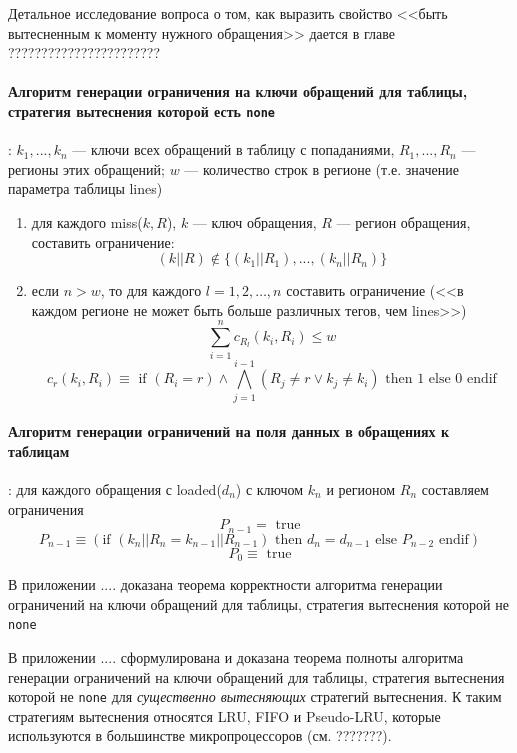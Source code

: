 \documentclass[14pt]{extreport}
\newcommand{\LRU}{\textsf{LRU}\xspace}
\newcommand{\FIFO}{\textsf{FIFO}\xspace}
\newcommand{\PseudoLRU}{\textsf{Pseudo-LRU}\xspace}
\begin{document}
Детальное исследование вопроса о том, как выразить свойство <<быть вытесненным к моменту нужного обращения>> дается в главе ???????????????????????

\paragraph{Алгоритм генерации ограничения на ключи обращений для таблицы, стратегия вытеснения которой есть \texttt{none}}: $k_1, ..., k_n$ --- ключи всех обращений в таблицу с попаданиями, $R_1, ..., R_n$ --- регионы этих обращений; $w$ --- количество строк в регионе (т.е. значение параметра таблицы lines)

\begin{enumerate}
    \item для каждого miss($k, R$), $k$ --- ключ обращения, $R$ --- регион обращения, составить ограничение: $$(k||R) \notin \{(k_1||R_1), ..., (k_n||R_n) \}$$

    \item если $n > w$, то для каждого $l = 1, 2, \dots, n$ составить ограничение (<<в каждом регионе не может быть больше различных тегов, чем lines>>)
$$\sum_{i=1}^n c_{R_l} (k_i, R_i) \leqslant w$$
$$c_r (k_i, R_i) \equiv \mbox{~if~} (R_i = r ) \wedge \bigwedge_{j=1}^{i-1} (R_j \neq r \vee k_j \neq k_i) \mbox{~then~} 1 \mbox{~else~} 0 \mbox{~endif}$$
\end{enumerate}

\paragraph{Алгоритм генерации ограничений на поля данных в обращениях к таблицам}:
для каждого обращения с loaded($d_n$) с ключом $k_n$ и регионом $R_n$ составляем ограничения
$$P_{n-1} = \mbox{~true}$$
$$P_{n-1} \equiv (\mbox{if~} (k_n||R_n = k_{n-1}||R_{n-1}) \mbox{~then~} d_n = d_{n-1} \mbox{~else~} P_{n-2} \mbox{~endif})$$
$$P_0 \equiv \mbox{~true}$$

В приложении .... доказана теорема корректности алгоритма генерации ограничений на ключи обращений для таблицы, стратегия вытеснения которой не \texttt{none}

В приложении .... сформулирована и доказана теорема полноты алгоритма генерации ограничений на ключи обращений для таблицы, стратегия вытеснения которой не \texttt{none} для \emph{существенно вытесняющих} стратегий вытеснения. К таким стратегиям вытеснения относятся \LRU, \FIFO и \PseudoLRU, которые используются в большинстве микропроцессоров (см. ???????).
\end{document}
